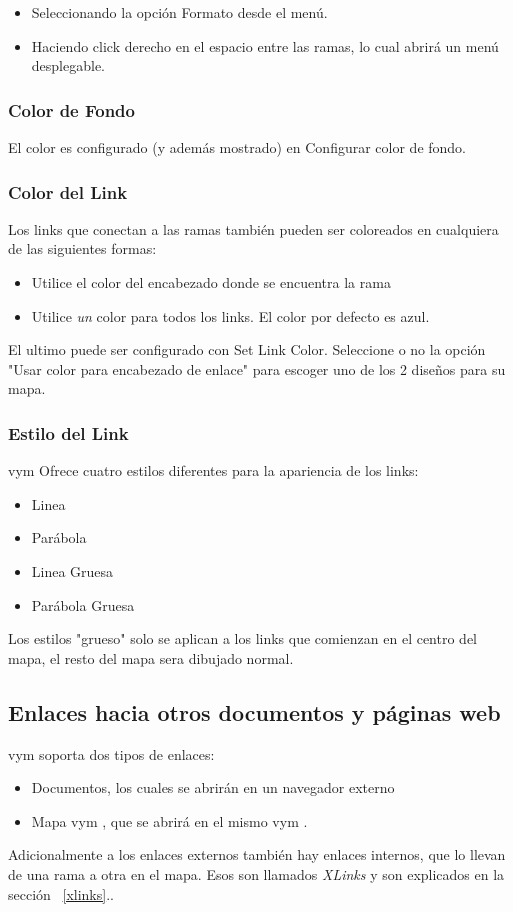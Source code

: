 \documentclass{article}
\newcommand{\vym}{{\sc vym }}
\begin{document}
\begin{itemize}
	\item Seleccionando la opci\'on Formato desde el men\'u.
	\item Haciendo click derecho en el espacio entre las ramas, lo cual abrir\'a un men\'u desplegable.
\end{itemize}

\subsubsection*{Color de Fondo}
El color es configurado (y adem\'as mostrado) en Configurar color de fondo.

\subsubsection*{Color del Link}
Los links que conectan  a las ramas tambi\'en pueden ser coloreados en cualquiera de las siguientes formas:
\begin{itemize}
	\item Utilice el color del encabezado donde se encuentra la rama
	\item Utilice {\em un} color para todos los links. El color por defecto es azul.
\end{itemize}
El ultimo puede ser configurado con Set Link Color. Seleccione o no la opci\'on "Usar color para encabezado de enlace" para escoger uno de los 2 dise\~nos para su mapa.

\subsubsection*{Estilo del Link}
\vym Ofrece cuatro estilos diferentes para la apariencia de los links:
\begin{itemize}
	\item Linea
	\item Par\'abola
	\item Linea Gruesa
	\item Par\'abola Gruesa
	
\end{itemize}
Los estilos "grueso" solo se aplican a los links que comienzan en el centro del mapa, el resto del mapa sera dibujado normal.


\subsection{Enlaces hacia otros documentos y p\'aginas web}
\vym soporta dos tipos de enlaces:
\begin{itemize}
	\item Documentos, los cuales se abrir\'an en un navegador externo
	\item Mapa \vym, que se abrir\'a en el mismo \vym.
\end{itemize}
Adicionalmente a los enlaces externos tambi\'en hay enlaces internos, que lo llevan de una rama a otra en el mapa. Esos son llamados {\em XLinks} y son explicados en la secci\'on ~\ref{xlinks}..
\end{document}
